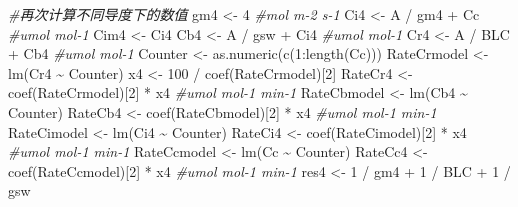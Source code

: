 \documentclass[
]{krantz}
\makeatletter
\newenvironment{Shaded}{\begin{snugshade}}{\end{snugshade}}
\newcommand{\CommentTok}[1]{\textcolor[rgb]{0.56,0.35,0.01}{\textit{#1}}}
\newcommand{\DecValTok}[1]{\textcolor[rgb]{0.00,0.00,0.81}{#1}}
\newcommand{\FunctionTok}[1]{\textcolor[rgb]{0.00,0.00,0.00}{#1}}
\newcommand{\NormalTok}[1]{#1}
\newcommand{\OtherTok}[1]{\textcolor[rgb]{0.56,0.35,0.01}{#1}}
\newcommand{\SpecialCharTok}[1]{\textcolor[rgb]{0.00,0.00,0.00}{#1}}
\newenvironment{kframe}{%
\medskip{}
\setlength{\fboxsep}{.8em}
 \def\at@end@of@kframe{}%
 \ifinner\ifhmode%
  \def\at@end@of@kframe{\end{minipage}}%
  \begin{minipage}{\columnwidth}%
 \fi\fi%
 \def\FrameCommand##1{\hskip\@totalleftmargin \hskip-\fboxsep
 \colorbox{shadecolor}{##1}\hskip-\fboxsep
     \hskip-\linewidth \hskip-\@totalleftmargin \hskip\columnwidth}%
 \MakeFramed {\advance\hsize-\width
   \@totalleftmargin\z@ \linewidth\hsize
   \@setminipage}}%
 {\par\unskip\endMakeFramed%
 \at@end@of@kframe}
\renewenvironment{Shaded}{\begin{kframe}}{\end{kframe}}
\makeatother
\begin{document}
\begin{Shaded}
\begin{Highlighting}[]
\CommentTok{\#再次计算不同导度下的数值}
\NormalTok{gm4 }\OtherTok{\textless{}{-}} \DecValTok{4} \CommentTok{\#mol m{-}2 s{-}1}
\NormalTok{Ci4 }\OtherTok{\textless{}{-}}\NormalTok{ A }\SpecialCharTok{/}\NormalTok{ gm4 }\SpecialCharTok{+}\NormalTok{ Cc }\CommentTok{\#umol mol{-}1}
\NormalTok{Cim4 }\OtherTok{\textless{}{-}}\NormalTok{ Ci4}
\NormalTok{Cb4 }\OtherTok{\textless{}{-}}\NormalTok{ A }\SpecialCharTok{/}\NormalTok{ gsw }\SpecialCharTok{+}\NormalTok{ Ci4 }\CommentTok{\#umol mol{-}1}
\NormalTok{Cr4 }\OtherTok{\textless{}{-}}\NormalTok{ A }\SpecialCharTok{/}\NormalTok{ BLC }\SpecialCharTok{+}\NormalTok{ Cb4 }\CommentTok{\#umol mol{-}1}
\NormalTok{Counter }\OtherTok{\textless{}{-}} \FunctionTok{as.numeric}\NormalTok{(}\FunctionTok{c}\NormalTok{(}\DecValTok{1}\SpecialCharTok{:}\FunctionTok{length}\NormalTok{(Cc)))}
\NormalTok{RateCrmodel }\OtherTok{\textless{}{-}} \FunctionTok{lm}\NormalTok{(Cr4 }\SpecialCharTok{\textasciitilde{}}\NormalTok{ Counter)}
\NormalTok{x4 }\OtherTok{\textless{}{-}} \DecValTok{100} \SpecialCharTok{/} \FunctionTok{coef}\NormalTok{(RateCrmodel)[}\DecValTok{2}\NormalTok{]}
\NormalTok{RateCr4 }\OtherTok{\textless{}{-}} \FunctionTok{coef}\NormalTok{(RateCrmodel)[}\DecValTok{2}\NormalTok{] }\SpecialCharTok{*}\NormalTok{ x4 }\CommentTok{\#umol mol{-}1 min{-}1}
\NormalTok{RateCbmodel }\OtherTok{\textless{}{-}} \FunctionTok{lm}\NormalTok{(Cb4 }\SpecialCharTok{\textasciitilde{}}\NormalTok{ Counter)}
\NormalTok{RateCb4 }\OtherTok{\textless{}{-}} \FunctionTok{coef}\NormalTok{(RateCbmodel)[}\DecValTok{2}\NormalTok{] }\SpecialCharTok{*}\NormalTok{ x4 }\CommentTok{\#umol mol{-}1 min{-}1}
\NormalTok{RateCimodel }\OtherTok{\textless{}{-}} \FunctionTok{lm}\NormalTok{(Ci4 }\SpecialCharTok{\textasciitilde{}}\NormalTok{ Counter)}
\NormalTok{RateCi4 }\OtherTok{\textless{}{-}} \FunctionTok{coef}\NormalTok{(RateCimodel)[}\DecValTok{2}\NormalTok{] }\SpecialCharTok{*}\NormalTok{ x4 }\CommentTok{\#umol mol{-}1 min{-}1}
\NormalTok{RateCcmodel }\OtherTok{\textless{}{-}} \FunctionTok{lm}\NormalTok{(Cc }\SpecialCharTok{\textasciitilde{}}\NormalTok{ Counter)}
\NormalTok{RateCc4 }\OtherTok{\textless{}{-}} \FunctionTok{coef}\NormalTok{(RateCcmodel)[}\DecValTok{2}\NormalTok{] }\SpecialCharTok{*}\NormalTok{ x4 }\CommentTok{\#umol mol{-}1 min{-}1}
\NormalTok{res4 }\OtherTok{\textless{}{-}} \DecValTok{1} \SpecialCharTok{/}\NormalTok{ gm4 }\SpecialCharTok{+} \DecValTok{1} \SpecialCharTok{/}\NormalTok{ BLC }\SpecialCharTok{+} \DecValTok{1} \SpecialCharTok{/}\NormalTok{ gsw}


\end{Highlighting}
\end{Shaded}
\end{document}
